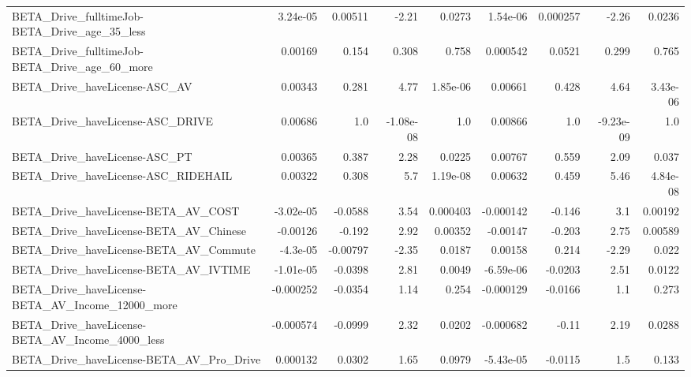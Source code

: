 \begin{tabular}{lrrrrrrrr}
BETA\_Drive\_fulltimeJob-BETA\_Drive\_age\_35\_less      &    3.24e-05 &      0.00511 &     -2.21 &   0.0273 &   1.54e-06 &    0.000257 &        -2.26 &        0.0236 \\
BETA\_Drive\_fulltimeJob-BETA\_Drive\_age\_60\_more      &     0.00169 &        0.154 &     0.308 &    0.758 &   0.000542 &      0.0521 &        0.299 &         0.765 \\
BETA\_Drive\_haveLicense-ASC\_AV                      &     0.00343 &        0.281 &      4.77 & 1.85e-06 &    0.00661 &       0.428 &         4.64 &      3.43e-06 \\
BETA\_Drive\_haveLicense-ASC\_DRIVE                   &     0.00686 &          1.0 & -1.08e-08 &      1.0 &    0.00866 &         1.0 &    -9.23e-09 &           1.0 \\
BETA\_Drive\_haveLicense-ASC\_PT                      &     0.00365 &        0.387 &      2.28 &   0.0225 &    0.00767 &       0.559 &         2.09 &         0.037 \\
BETA\_Drive\_haveLicense-ASC\_RIDEHAIL                &     0.00322 &        0.308 &       5.7 & 1.19e-08 &    0.00632 &       0.459 &         5.46 &      4.84e-08 \\
BETA\_Drive\_haveLicense-BETA\_AV\_COST                &   -3.02e-05 &      -0.0588 &      3.54 & 0.000403 &  -0.000142 &      -0.146 &          3.1 &       0.00192 \\
BETA\_Drive\_haveLicense-BETA\_AV\_Chinese             &    -0.00126 &       -0.192 &      2.92 &  0.00352 &   -0.00147 &      -0.203 &         2.75 &       0.00589 \\
BETA\_Drive\_haveLicense-BETA\_AV\_Commute             &    -4.3e-05 &     -0.00797 &     -2.35 &   0.0187 &    0.00158 &       0.214 &        -2.29 &         0.022 \\
BETA\_Drive\_haveLicense-BETA\_AV\_IVTIME              &   -1.01e-05 &      -0.0398 &      2.81 &   0.0049 &  -6.59e-06 &     -0.0203 &         2.51 &        0.0122 \\
BETA\_Drive\_haveLicense-BETA\_AV\_Income\_12000\_more   &   -0.000252 &      -0.0354 &      1.14 &    0.254 &  -0.000129 &     -0.0166 &          1.1 &         0.273 \\
BETA\_Drive\_haveLicense-BETA\_AV\_Income\_4000\_less    &   -0.000574 &      -0.0999 &      2.32 &   0.0202 &  -0.000682 &       -0.11 &         2.19 &        0.0288 \\
BETA\_Drive\_haveLicense-BETA\_AV\_Pro\_Drive           &    0.000132 &       0.0302 &      1.65 &   0.0979 &  -5.43e-05 &     -0.0115 &          1.5 &         0.133 \\

\end{tabular}
